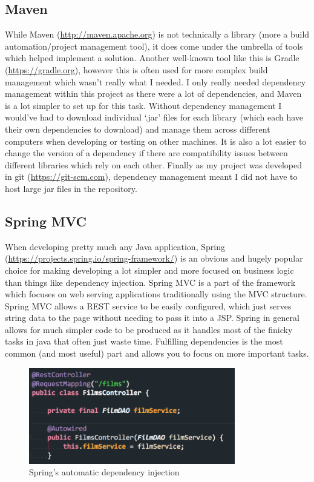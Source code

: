 \documentclass[12pt]{article}
\begin{document}
  \subsection{Maven}
    While Maven (\url{http://maven.apache.org}) is not technically a library (more a build automation/project management tool), it does come under the umbrella of tools which helped implement a solution. Another well-known tool like this is Gradle (\url{https://gradle.org}), however this is often used for more complex build management which wasn't really what I needed. I only really needed dependency management within this project as there were a lot of dependencies, and Maven is a lot simpler to set up for this task. Without dependency management I would've had to download individual ‘.jar’ files for each library (which each have their own dependencies to download) and manage them across different computers when developing or testing on other machines. It is also a lot easier to change the version of a dependency if there are compatibility issues between different libraries which rely on each other. Finally as my project was developed in git (\url{https://git-scm.com}), dependency management meant I did not have to host large jar files in the repository.

  \subsection{Spring MVC}
    \label{spring-mvc}
    When developing pretty much any Java application, Spring (\url{https://projects.spring.io/spring-framework/}) is an obvious and hugely popular choice for making developing a lot simpler and more focused on business logic than things like dependency injection. Spring MVC is a part of the framework which focuses on web serving applications traditionally using the MVC structure. Spring MVC allows a REST \citep{fielding2000architectural} service to be easily configured, which just serves string data to the page without needing to pass it into a JSP. Spring in general allows for much simpler code to be produced as it handles most of the finicky tasks in java that often just waste time. Fulfilling dependencies is the most common (and most useful) part and allows you to focus on more important tasks.

    \begin{figure}[ht]
      \centering
      \includegraphics[width=9cm]{autowired-components}
      \caption{Spring's automatic dependency injection}
      \label{fig:spring-autowired-components}
    \end{figure}
\end{document}

